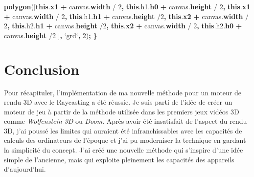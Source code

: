 \documentclass[11pt,french,a4paper,]{article}
\newenvironment{Shaded}{\begin{snugshade}}{\end{snugshade}}
\newcommand{\AttributeTok}[1]{\textcolor[rgb]{0.00,0.36,0.77}{\textbf{#1}}}
\newcommand{\DecValTok}[1]{\textcolor[rgb]{0.00,0.00,0.81}{#1}}
\newcommand{\KeywordTok}[1]{\textcolor[rgb]{0.68,0.35,0.62}{\textbf{#1}}}
\newcommand{\NormalTok}[1]{#1}
\newcommand{\OperatorTok}[1]{\textcolor[rgb]{0.81,0.36,0.00}{\textbf{#1}}}
\newcommand{\VariableTok}[1]{\textcolor[rgb]{0.90,0.33,0.00}{#1}}
\newcommand{\VerbatimStringTok}[1]{\textcolor[rgb]{0.30,0.62,0.00}{#1}}
\begin{document}
\begin{Shaded}
\begin{Highlighting}[]
    \AttributeTok{polygon}\NormalTok{([}\KeywordTok{this}\NormalTok{.}\AttributeTok{x1} \OperatorTok{+} \VariableTok{canvas}\NormalTok{.}\AttributeTok{width}\NormalTok{ / }\DecValTok{2}\OperatorTok{,} \KeywordTok{this}\NormalTok{.}\VariableTok{h1}\NormalTok{.}\AttributeTok{h0} \OperatorTok{+} \VariableTok{canvas}\NormalTok{.}\AttributeTok{height}\NormalTok{ / }\DecValTok{2}\OperatorTok{,}
    \KeywordTok{this}\NormalTok{.}\AttributeTok{x1} \OperatorTok{+} \VariableTok{canvas}\NormalTok{.}\AttributeTok{width}\NormalTok{ / }\DecValTok{2}\OperatorTok{,} \KeywordTok{this}\NormalTok{.}\VariableTok{h1}\NormalTok{.}\AttributeTok{h1} \OperatorTok{+} \VariableTok{canvas}\NormalTok{.}\AttributeTok{height}\NormalTok{ /}\DecValTok{2}\OperatorTok{,}
    \KeywordTok{this}\NormalTok{.}\AttributeTok{x2} \OperatorTok{+} \VariableTok{canvas}\NormalTok{.}\AttributeTok{width}\NormalTok{ / }\DecValTok{2}\OperatorTok{,} \KeywordTok{this}\NormalTok{.}\VariableTok{h2}\NormalTok{.}\AttributeTok{h1} \OperatorTok{+} \VariableTok{canvas}\NormalTok{.}\AttributeTok{height}\NormalTok{ /}\DecValTok{2}\OperatorTok{,}
    \KeywordTok{this}\NormalTok{.}\AttributeTok{x2} \OperatorTok{+} \VariableTok{canvas}\NormalTok{.}\AttributeTok{width}\NormalTok{ / }\DecValTok{2}\OperatorTok{,} \KeywordTok{this}\NormalTok{.}\VariableTok{h2}\NormalTok{.}\AttributeTok{h0} \OperatorTok{+} \VariableTok{canvas}\NormalTok{.}\AttributeTok{height}\NormalTok{ /}\DecValTok{2}
\NormalTok{    ]}\OperatorTok{,} \VerbatimStringTok{`grd`}\OperatorTok{,} \DecValTok{2}\NormalTok{)}\OperatorTok{;}
\OperatorTok{\}}
\end{Highlighting}
\end{Shaded}

\hypertarget{conclusion}{%
\section{Conclusion}\label{conclusion}}

Pour récapituler, l'implémentation de ma nouvelle méthode pour un moteur
de rendu 3D avec le Raycasting a été réussie. Je suis parti de l'idée de
créer un moteur de jeu à partir de la méthode utilisée dans les premiers
jeux vidéos 3D comme \emph{Wolfenstein 3D} ou \emph{Doom}. Après avoir
été insatisfait de l'aspect du rendu 3D, j'ai poussé les limites qui
auraient été infranchissables avec les capacités de calculs des
ordinateurs de l'époque et j'ai pu moderniser la technique en gardant la
simplicité du concept. J'ai créé une nouvelle méthode qui s'inspire
d'une idée simple de l'ancienne, mais qui exploite pleinement les
capacités des appareils d'aujourd'hui.
\end{document}
